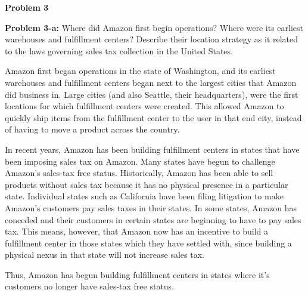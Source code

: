 \documentclass[psamsfonts]{amsart}
\newenvironment{sol}{\vspace{0.25cm}{\large \bfseries Solution:}}{\qedsymbol}
\newenvironment{prob}[1]{\begin{framed}{\large \bfseries Problem #1:}}{\end{framed}}
\begin{document}
\vspace{1cm}
\begin{center}
{\Large \bfseries Problem 3}
\end{center}

\begin{prob}{3-a}
Where did Amazon first begin operations? Where were its earliest warehouses and fulfillment centers? Describe their location strategy as it related to the laws governing sales tax collection in the United States.
\end{prob}
\begin{sol}
Amazon first began operations in the state of Washington, and its earliest warehouses and fulfillment centers began next to the largest cities that Amazon did business in. Large cities (and also Seattle, their headquarters), were the first locations for which fulfillment centers were created. This allowed Amazon to quickly ship items from the fulfillment center to the user in that end city, instead of having to move a product across the country. 

In recent years, Amazon has been building fulfillment centers in states that have been imposing sales tax on Amazon. Many states have begun to challenge Amazon's sales-tax free status. Historically, Amazon has been able to sell products without sales tax because it has no physical presence in a particular state. Individual states such as California have been filing litigation to make Amazon's customers pay sales taxes in their states. In some states, Amazon has conceded and their customers in certain states are beginning to have to pay sales tax. This means, however, that Amazon now has an incentive to build a fulfillment center in those states which they have settled with, since building a physical nexus in that state will not increase sales tax. 

Thus, Amazon has begun building fulfillment centers in states where it's customers no longer have sales-tax free status.
\end{sol}
\end{document}
